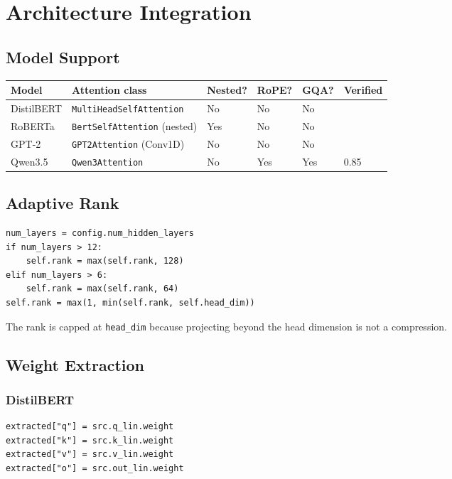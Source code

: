 
\section{Architecture Integration}

\subsection{Model Support}

\begin{table}[H]
\centering
\small
\begin{tabular}{llllll}
\toprule
\textbf{Model} & \textbf{Attention class} & \textbf{Nested?} & \textbf{RoPE?} & \textbf{GQA?} & \textbf{Verified} \\
\midrule
DistilBERT & \texttt{MultiHeadSelfAttention} & No & No & No &  \\
RoBERTa & \texttt{BertSelfAttention} (nested) & Yes & No & No &  \\
GPT-2 & \texttt{GPT2Attention} (Conv1D) & No & No & No &  \\
Qwen3.5 & \texttt{Qwen3Attention} & No & Yes & Yes & 0.85 \\
\bottomrule
\end{tabular}
\end{table}

\subsection{Adaptive Rank}

\begin{lstlisting}
num_layers = config.num_hidden_layers
if num_layers > 12:
    self.rank = max(self.rank, 128)
elif num_layers > 6:
    self.rank = max(self.rank, 64)
self.rank = max(1, min(self.rank, self.head_dim))
\end{lstlisting}

The rank is capped at \texttt{head\_dim} because projecting beyond the head 
dimension is not a compression.

\subsection{Weight Extraction}

\subsubsection{DistilBERT}

\begin{lstlisting}
extracted["q"] = src.q_lin.weight
extracted["k"] = src.k_lin.weight
extracted["v"] = src.v_lin.weight
extracted["o"] = src.out_lin.weight
\end{lstlisting}

